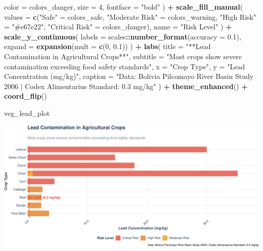 \documentclass[
]{article}
\newenvironment{Shaded}{\begin{snugshade}}{\end{snugshade}}
\newcommand{\AttributeTok}[1]{\textcolor[rgb]{0.13,0.29,0.53}{#1}}
\newcommand{\DecValTok}[1]{\textcolor[rgb]{0.00,0.00,0.81}{#1}}
\newcommand{\FloatTok}[1]{\textcolor[rgb]{0.00,0.00,0.81}{#1}}
\newcommand{\FunctionTok}[1]{\textcolor[rgb]{0.13,0.29,0.53}{\textbf{#1}}}
\newcommand{\NormalTok}[1]{#1}
\newcommand{\OtherTok}[1]{\textcolor[rgb]{0.56,0.35,0.01}{#1}}
\newcommand{\SpecialCharTok}[1]{\textcolor[rgb]{0.81,0.36,0.00}{\textbf{#1}}}
\newcommand{\StringTok}[1]{\textcolor[rgb]{0.31,0.60,0.02}{#1}}
\begin{document}
\begin{Shaded}
\begin{Highlighting}[]
    \AttributeTok{color =}\NormalTok{ colors\_danger,}
    \AttributeTok{size =} \DecValTok{4}\NormalTok{,}
    \AttributeTok{fontface =} \StringTok{"bold"}
\NormalTok{  ) }\SpecialCharTok{+}
  \FunctionTok{scale\_fill\_manual}\NormalTok{(}
    \AttributeTok{values =} \FunctionTok{c}\NormalTok{(}\StringTok{"Safe"} \OtherTok{=}\NormalTok{ colors\_safe, }
               \StringTok{"Moderate Risk"} \OtherTok{=}\NormalTok{ colors\_warning, }
               \StringTok{"High Risk"} \OtherTok{=} \StringTok{"\#e67e22"}\NormalTok{, }
               \StringTok{"Critical Risk"} \OtherTok{=}\NormalTok{ colors\_danger),}
    \AttributeTok{name =} \StringTok{"Risk Level"}
\NormalTok{  ) }\SpecialCharTok{+}
  \FunctionTok{scale\_y\_continuous}\NormalTok{(}
    \AttributeTok{labels =}\NormalTok{ scales}\SpecialCharTok{::}\FunctionTok{number\_format}\NormalTok{(}\AttributeTok{accuracy =} \FloatTok{0.1}\NormalTok{),}
    \AttributeTok{expand =} \FunctionTok{expansion}\NormalTok{(}\AttributeTok{mult =} \FunctionTok{c}\NormalTok{(}\DecValTok{0}\NormalTok{, }\FloatTok{0.1}\NormalTok{))}
\NormalTok{  ) }\SpecialCharTok{+}
  \FunctionTok{labs}\NormalTok{(}
    \AttributeTok{title =} \StringTok{"**Lead Contamination in Agricultural Crops**"}\NormalTok{,}
    \AttributeTok{subtitle =} \StringTok{"Most crops show severe contamination exceeding food safety standards"}\NormalTok{,}
    \AttributeTok{x =} \StringTok{"Crop Type"}\NormalTok{,}
    \AttributeTok{y =} \StringTok{"Lead Concentration (mg/kg)"}\NormalTok{,}
    \AttributeTok{caption =} \StringTok{"Data: Bolivia Pilcomayo River Basin Study 2006 | Codex Alimentarius Standard: 0.3 mg/kg"}
\NormalTok{  ) }\SpecialCharTok{+}
  \FunctionTok{theme\_enhanced}\NormalTok{() }\SpecialCharTok{+}
  \FunctionTok{coord\_flip}\NormalTok{()}

\NormalTok{veg\_lead\_plot}
\end{Highlighting}
\end{Shaded}

\includegraphics{WHO_standards_pdf_02_files/figure-latex/vegetation-lead-1.pdf}
\end{document}
